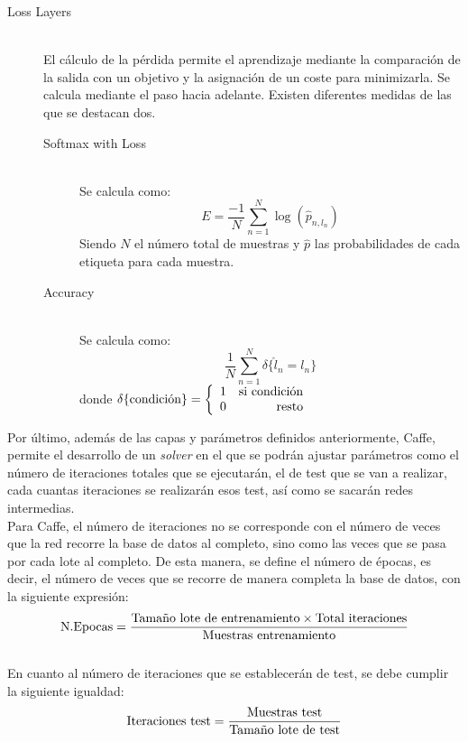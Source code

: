 \begin{description}
\vspace{50pt}
\item[Loss Layers] \hfill 
\vspace{10pt}
\\
	El cálculo de la pérdida permite el aprendizaje mediante la comparación de la salida con un objetivo y la asignación de un coste para minimizarla. Se calcula mediante el paso hacia adelante. Existen diferentes medidas de las que se destacan dos.
	\vspace{10pt}
	\begin{description}
	\item[Softmax with Loss] \hfill 
	\vspace{5pt}
	\\
		Se calcula como: 
		$$E = \frac{-1}{N} \sum\limits_{n=1}^N \log(\hat{p}_{n,l_n})$$
		Siendo $N$ el número total de muestras y $\hat{p}$ las probabilidades de cada etiqueta para cada muestra.
		\vspace{10pt}
	\item[Accuracy] \hfill 
	\vspace{5pt}
	\\
		Se calcula como:
		$$\frac{1}{N} \sum\limits_{n=1}^N \delta\{ \hat{l}_n = l_n \}$$
		donde $\delta\{ \textup{condición}\} = \left\{ \begin{array}{lr} 1 &  \textup{si condición} \\ 0 & \mbox{resto} \end{array} \right.$
	\end{description}
	
\end{description}
\vspace{20pt}
Por último, además de las capas y parámetros definidos anteriormente, Caffe, permite el desarrollo de un \textit{solver} en el que se podrán ajustar parámetros como el número de iteraciones totales que se ejecutarán, el de test que se van a realizar, cada cuantas iteraciones se realizarán esos test, así como se sacarán redes intermedias.\\
Para Caffe, el número de iteraciones no se corresponde con el número de veces que la red recorre la base de datos al completo, sino como las veces que se pasa por cada lote al completo. De esta manera, se define el número de épocas, es decir, el número de veces que se recorre de manera completa la base de datos, con la siguiente expresión:\\
$$\textup{N.Epocas}=\frac{\textup{Tamaño lote de entrenamiento}\times \textup{Total iteraciones}}{\textup{Muestras entrenamiento}} $$\\
En cuanto al número de iteraciones que se establecerán de test, se debe cumplir la siguiente igualdad:
$$\textup{Iteraciones test}=\frac{\textup{Muestras test}}{\textup{Tamaño lote de test}}$$
